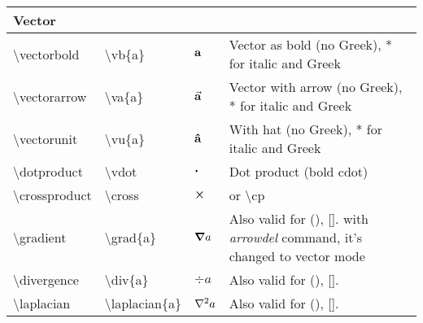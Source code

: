 \documentclass{article}
\def\tbs{\textbackslash}
\begin{document}
\begin{center}
\begin{table}[htp]
\begin{tabular}{|p{3cm}||l|l|p{6cm}|}
    \end{tabular}
    \begin{tabular}{|p{3cm}||l|l|p{6cm}|}
    \toprule
    \textbf{Vector}           &                                  &                          &
    \\ \hline
    \tbs vectorbold           & \tbs vb\{a\}                     & $\vb{a}$                 & Vector as bold (no Greek), * for italic and Greek
    \\ \hline
    \tbs vectorarrow          & \tbs va\{a\}                     & $\va{a}$                 & Vector with arrow (no Greek), * for italic and Greek
    \\ \hline
    \tbs vectorunit           & \tbs vu\{a\}                     & $\vu{a}$                 & With hat (no Greek), * for italic and Greek
    \\ \hline
    \tbs dotproduct           & \tbs vdot                        & $\vdot$                  & Dot product (bold cdot)
    \\ \hline
    \tbs crossproduct         & \tbs cross                       & $\cross$                 & or \tbs cp
    \\ \hline
    \tbs gradient             & \tbs grad\{a\}                   & $\grad{a}$               & Also valid for (), []. with \textit{arrowdel} command, it's changed to vector mode
    \\ \hline
    \tbs divergence           & \tbs div\{a\}                    & $\div{a}$                & Also valid for (), [].
    \\ \hline
    \tbs laplacian            & \tbs laplacian\{a\}              & $\laplacian{a}$          & Also valid for (), [].
    \\ \hline \hline
    \end{tabular}
\end{table}
\end{center}
\end{document}
